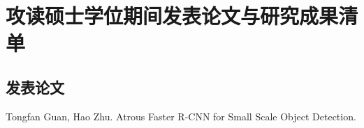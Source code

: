 \chapter*{攻读硕士学位期间发表论文与研究成果清单}

\section*{发表论文}
Tongfan Guan, Hao Zhu. Atrous Faster R-CNN for Small Scale Object Detection.